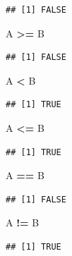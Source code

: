 \documentclass[]{book}
\newenvironment{Shaded}{\begin{snugshade}}{\end{snugshade}}
\newcommand{\NormalTok}[1]{#1}
\newcommand{\OperatorTok}[1]{\textcolor[rgb]{0.81,0.36,0.00}{\textbf{#1}}}
\newcommand{\StringTok}[1]{\textcolor[rgb]{0.31,0.60,0.02}{#1}}
\begin{document}
\begin{verbatim}
## [1] FALSE
\end{verbatim}

\begin{Shaded}
\begin{Highlighting}[]
\NormalTok{A }\OperatorTok{>=}\StringTok{ }\NormalTok{B}
\end{Highlighting}
\end{Shaded}

\begin{verbatim}
## [1] FALSE
\end{verbatim}

\begin{Shaded}
\begin{Highlighting}[]
\NormalTok{A }\OperatorTok{<}\StringTok{  }\NormalTok{B}
\end{Highlighting}
\end{Shaded}

\begin{verbatim}
## [1] TRUE
\end{verbatim}

\begin{Shaded}
\begin{Highlighting}[]
\NormalTok{A }\OperatorTok{<=}\StringTok{ }\NormalTok{B}
\end{Highlighting}
\end{Shaded}

\begin{verbatim}
## [1] TRUE
\end{verbatim}

\begin{Shaded}
\begin{Highlighting}[]
\NormalTok{A }\OperatorTok{==}\StringTok{ }\NormalTok{B}
\end{Highlighting}
\end{Shaded}

\begin{verbatim}
## [1] FALSE
\end{verbatim}

\begin{Shaded}
\begin{Highlighting}[]
\NormalTok{A }\OperatorTok{!=}\StringTok{ }\NormalTok{B}
\end{Highlighting}
\end{Shaded}

\begin{verbatim}
## [1] TRUE
\end{verbatim}
\end{document}
